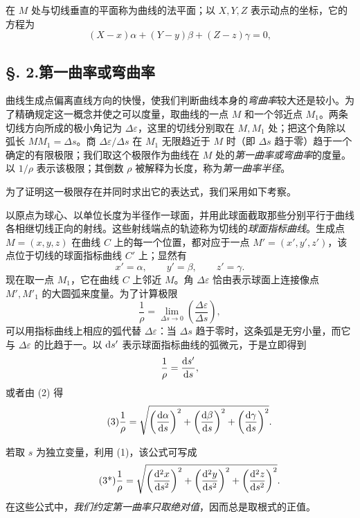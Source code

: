 在 \(M\) 处与切线垂直的平面称为曲线的法平面；以 \(X,Y,Z\) 表示动点的坐标，它的方程为
\[
(X-x)\alpha+(Y-y)\beta+(Z-z)\gamma=0,
\]

\subsection*{§. 2.\quad 第一曲率或弯曲率}
曲线生成点偏离直线方向的快慢，使我们判断曲线本身的\emph{弯曲率}较大还是较小。为了精确规定这一概念并使之可以度量，取曲线的一点 \(M\) 和一个邻近点 \(M_1\)。两条切线方向所成的极小角记为 \(\Delta\varepsilon\)，这里的切线分别取在 \(M,M_1\) 处；把这个角除以弧长 \(MM_1=\Delta s\)。商 \(\Delta\varepsilon/\Delta s\) 在 \(M_1\) 无限趋近于 \(M\) 时（即 \(\Delta s\) 趋于零）趋于一个确定的有限极限；我们取这个极限作为曲线在 \(M\) 处的\emph{第一曲率或弯曲率}的度量。以 \(1/\rho\) 表示该极限；其倒数 \(\rho\) 被解释为长度，称为\emph{第一曲率半径}。

为了证明这一极限存在并同时求出它的表达式，我们采用如下考察。

以原点为球心、以单位长度为半径作一球面，并用此球面截取那些分别平行于曲线各相继切线正向的射线。这些射线端点的轨迹称为切线的\emph{球面指标曲线}。生成点 \(M=(x,y,z)\) 在曲线 \(C\) 上的每一个位置，都对应于一点 \(M'=(x',y',z')\)，该点位于切线的球面指标曲线 \(C'\) 上；显然有
\begin{equation}\tag{2}
x'=\alpha,\qquad y'=\beta,\qquad z'=\gamma.
\end{equation}
现在取一点 \(M_1\)，它在曲线 \(C\) 上邻近 \(M\)。角 \(\Delta\varepsilon\) 恰由表示球面上连接像点 \(M',M'_1\) 的大圆弧来度量。为了计算极限
\[
\frac{1}{\rho}=\lim_{\Delta s\to0}\left(\frac{\Delta\varepsilon}{\Delta s}\right),
\]
可以用指标曲线上相应的弧代替 \(\Delta\varepsilon\)：当 \(\Delta s\) 趋于零时，这条弧是无穷小量，而它与 \(\Delta\varepsilon\) 的比趋于一。以 \(\mathrm{d} s'\) 表示球面指标曲线的弧微元，于是立即得到
\[
\frac{1}{\rho}=\frac{\mathrm{d} s'}{\mathrm{d} s},
\]
或者由 (2) 得
\begin{equation}\tag{3}
\frac{1}{\rho}=\sqrt{\left(\frac{\mathrm{d}\alpha}{\mathrm{d} s}\right)^2+\left(\frac{\mathrm{d}\beta}{\mathrm{d} s}\right)^2+\left(\frac{\mathrm{d}\gamma}{\mathrm{d} s}\right)^2}.
\end{equation}

若取 \(s\) 为独立变量，利用 (1)，该公式可写成
\begin{equation}\tag{3*}
\frac{1}{\rho}=\sqrt{\left(\frac{\mathrm{d}^2x}{\mathrm{d} s^2}\right)^2+\left(\frac{\mathrm{d}^2y}{\mathrm{d} s^2}\right)^2+\left(\frac{\mathrm{d}^2z}{\mathrm{d} s^2}\right)^2}.
\end{equation}
在这些公式中，\emph{我们约定第一曲率只取绝对值}，因而总是取根式的正值。

